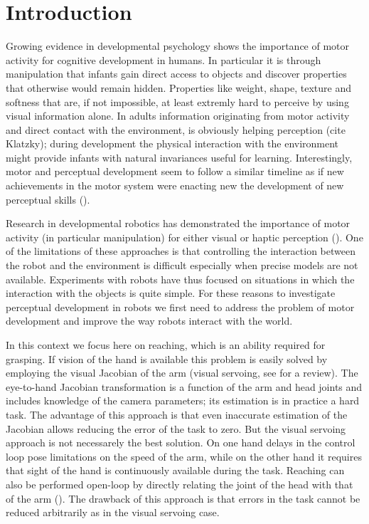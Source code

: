 \section{Introduction}
Growing evidence in developmental psychology shows the importance 
of motor activity for cognitive development in humans. In particular 
it is through manipulation that infants gain direct access to objects 
and discover properties that otherwise would remain hidden. 
Properties like weight, shape, texture and softness that 
are, if not impossible, at least extremly hard to perceive by using
visual information alone. In adults information originating 
from motor activity and direct contact with the environment, is 
obviously helping perception (cite Klatzky); during development
the physical interaction with the environment might
provide infants with natural invariances useful for learning.
Interestingly, motor and perceptual development seem to follow a similar 
timeline as if new achievements in the motor system were enacting new
the development of new perceptual skills (\cite{bushnell93motor}\cite{needham2002pick-me-up}).

Research in developmental robotics has demonstrated the importance of
motor activity (in particular manipulation) for either visual or haptic 
perception (\cite{fitzpatrick07shared}). One of the 
limitations of these approaches is that controlling the interaction between
the robot and the environment is difficult especially when precise models are
not available. Experiments with robots have thus focused on situations
in which the interaction with the objects is quite simple. For these reasons
to investigate perceptual development in robots we first need to 
address the problem of motor development and improve the way robots interact
with the world.

In this context we focus here on reaching, which is an ability required for 
grasping. If vision of the hand is available this problem is easily solved 
by employing the visual Jacobian of the arm (visual servoing, see 
\cite{hutchinson96tutorial} for a review). The 
eye-to-hand Jacobian transformation is a function of the arm and head joints 
and includes knowledge of the camera parameters; its estimation is in practice 
a hard task.
The advantage of this approach is that even inaccurate estimation of the Jacobian
allows reducing the error of the task to zero. But the visual servoing approach 
is not necessarely the best solution. On one hand delays in the control loop pose 
limitations on the speed of the arm, while on the other hand it
requires that sight of the hand is continuously available during the task. 
Reaching can also be performed open-loop by directly relating the joint of 
the head with that of the arm 
(\cite{blackburn94learning}\cite{metta99developmental}). 
The drawback of this approach is that errors in the task cannot be reduced 
arbitrarily as in the visual servoing case.

